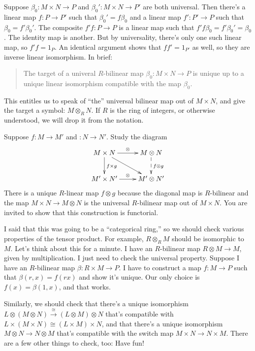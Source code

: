 \begin{property}[Uniqueness]
Suppose $\beta_0:M\times N\to P$ and $\beta_0':M\times N\to P'$ are both universal. Then there's a linear map $f:P\to P'$ such that $\beta_0'=f\beta_0$ and a linear map $f':P'\to P$ such that $\beta_0=f'\beta_0'$. 
The composite $f'f:P\to P$ is a linear map such that $f'f\beta_0=f'\beta_0'=\beta_0$. The identity map is another. But by universality, there's only one such linear map, so $f'f=1_P$. An identical argument shows that $ff'=1_{P'}$ as well, so they are inverse linear isomorphism. In brief: 
\begin{quote}
The target of a univeral $R$-bilinear map $\beta_0:M\times N\to P$ is unique up to a unique linear isomorphism compatible with the map $\beta_0$.
\end{quote}
This entitles us to speak of ``the'' universal bilinear map out of $M\times N$,
and give the target a symbol: $M\otimes_R N$. If $R$ is the ring of integers, or otherwise understood, we will drop it from the notation. 
\end{property}

\begin{property}[Functoriality] Suppose $f:M\to M'$ and $:N\to N'$. Study the diagram
\begin{equation*}
\xymatrix{M\times N\ar[d]^{f\times g}\ar[r]^\otimes\ar[dr] & M\otimes N\ar@{-->}[d]^{f\otimes g}\\
M^\prime\times N^\prime\ar[r]^\otimes & M^\prime\otimes N^\prime}
\end{equation*}
There is a unique $R$-linear map $f\otimes g$ because the diagonal map 
is $R$-bilinear and the map $M\times N\to M\otimes N$ is the universal
$R$-bilinear map out of $M\times N$. 
You are invited to show that this construction is functorial. 
\end{property}

\begin{property} 
I said that this was going to be a ``categorical ring,'' so we should check various properties of the tensor product. For example, $R\otimes_R M$ should be isomorphic to $M$. Let's think about this for a minute. I have an $R$-bilinear map $R\otimes M\to M$, given by multiplication. 
I just need to check the universal property. Suppose I have an $R$-bilinear map $\beta:R\times M\to P$. I have to construct a map $f:M\to P$ such that 
$\beta(r,x)=f(rx)$ and show it's unique. Our only choice is $f(x)=\beta(1,x)$,
and that works.

Similarly, we should check that there's a unique isomorphism $L\otimes(M\otimes N)\xrightarrow{\cong}(L\otimes M)\otimes N$ that's compatible with $L\times (M\times N)\cong (L\times M)\times N$, and that there's a unique isomorphism $M\otimes N\to N\otimes M$ that's compatible with the switch map $M\times N\to N\times M$. There are a few other things to check, too: Have fun!
\end{property}

